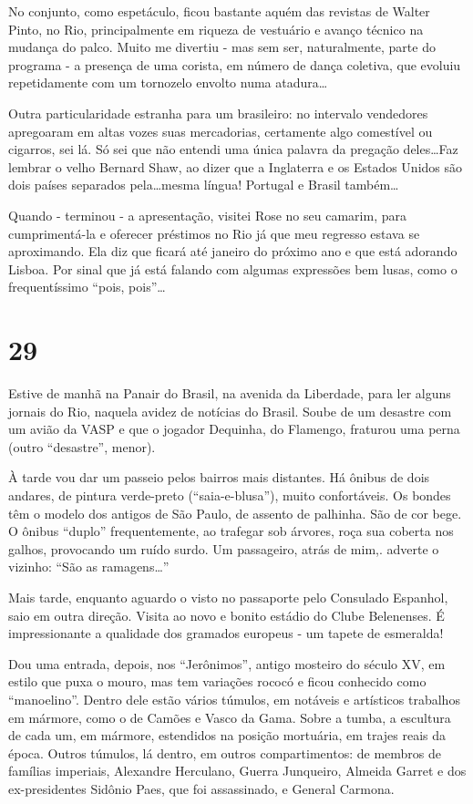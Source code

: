 No conjunto, como espetáculo, ficou bastante aquém das revistas de Walter Pinto, no Rio, principalmente em riqueza de vestuário e avanço técnico na mudança do palco. Muito me divertiu - mas sem ser, naturalmente, parte do programa - a presença de uma corista, em número de dança coletiva, que evoluiu repetidamente com um tornozelo envolto numa atadura\ldots

Outra particularidade estranha para um brasileiro: no intervalo vendedores apregoaram em altas vozes suas mercadorias, certamente algo comestível ou cigarros, sei lá. Só sei que não entendi uma única palavra da pregação deles\ldots Faz lembrar o velho Bernard Shaw, ao dizer que a Inglaterra e os Estados Unidos são dois países separados pela\ldots mesma língua! Portugal e Brasil também\ldots

Quando - terminou - a apresentação, visitei Rose no seu camarim, para cumprimentá-la e oferecer préstimos no Rio já que meu regresso estava se aproximando. Ela diz que ficará até janeiro do próximo ano e que está adorando Lisboa. Por sinal que já está falando com algumas expressões bem lusas, como o frequentíssimo ``pois, pois''\ldots

\section*{29 \adfflatleafright {}}
Estive de manhã na Panair do Brasil, na avenida da Liberdade, para ler alguns jornais do Rio, naquela avidez de notícias do Brasil. Soube de um desastre com um avião da VASP e que o jogador Dequinha, do Flamengo, fraturou uma perna (outro ``desastre'', menor).

À tarde vou dar um passeio pelos bairros mais distantes. Há ônibus de dois andares, de pintura verde-preto (``saia-e-blusa''), muito confortáveis. Os bondes têm o modelo dos antigos de São Paulo, de assento de palhinha. São de cor bege. O ônibus ``duplo'' frequentemente, ao trafegar sob árvores, roça sua coberta nos galhos, provocando um ruído surdo. Um passageiro, atrás de mim,. adverte o vizinho: ``São as ramagens\ldots''

Mais tarde, enquanto aguardo o visto no passaporte pelo Consulado Espanhol, saio em outra direção. Visita ao novo e bonito estádio do Clube Belenenses. É impressionante a qualidade dos gramados europeus - um tapete de esmeralda!

Dou uma entrada, depois, nos ``Jerônimos'', antigo mosteiro do século XV, em estilo que puxa o mouro, mas tem variações rococó e ficou conhecido como ``manoelino''. Dentro dele estão vários túmulos, em notáveis e artísticos trabalhos em mármore, como o de Camões e Vasco da Gama. Sobre a tumba, a escultura de cada um, em mármore, estendidos na posição mortuária, em trajes reais da época. Outros túmulos, lá dentro, em outros compartimentos: de membros de famílias imperiais, Alexandre Herculano, Guerra Junqueiro, Almeida Garret e dos ex-presidentes Sidônio Paes, que foi assassinado, e General Carmona.

